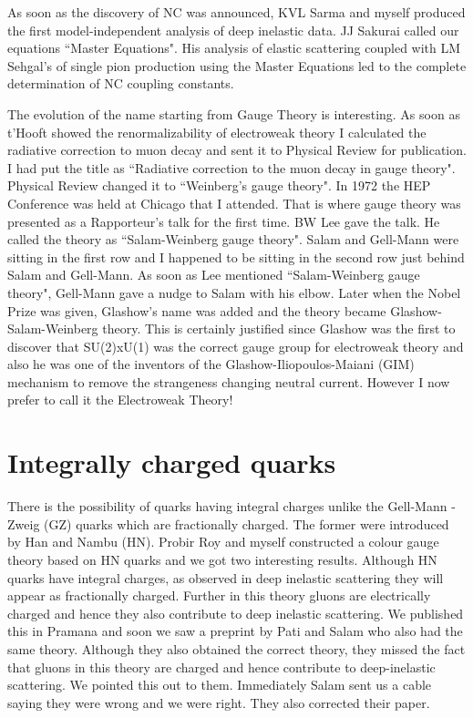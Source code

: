 As soon as the discovery of NC was announced, KVL Sarma and myself 
produced the first model-independent analysis of deep inelastic data. JJ 
Sakurai called our equations ``Master Equations". His analysis of elastic 
scattering coupled with LM Sehgal's of single pion production using the 
Master Equations led to the complete determination of NC coupling 
constants.
\smallskip

The evolution of the name starting from Gauge Theory is interesting. As 
soon as t'Hooft showed the renormalizability of electroweak theory I 
calculated the radiative correction to muon decay and sent it to 
Physical Review for publication. I had put the title as ``Radiative 
correction to the muon decay in gauge theory". Physical Review changed 
it to ``Weinberg's gauge theory". In 1972 the HEP Conference was held at 
Chicago that I attended. That is where gauge theory was presented as a 
Rapporteur's talk for the first time. BW Lee gave the talk. He called 
the theory as ``Salam-Weinberg gauge theory". Salam and Gell-Mann were 
sitting in the first row and I happened to be sitting in the second row 
just behind Salam and Gell-Mann. As soon as Lee mentioned 
``Salam-Weinberg gauge theory", Gell-Mann gave a nudge to Salam with his 
elbow. Later when the Nobel Prize was given, Glashow's name was added 
and the theory became Glashow-Salam-Weinberg theory. This is certainly 
justified since Glashow was the first to discover that SU(2)xU(1) was 
the correct gauge group for electroweak theory and also he was one of 
the inventors of the Glashow-Iliopoulos-Maiani (GIM) mechanism to remove 
the strangeness changing neutral current. However I now prefer to call 
it the Electroweak Theory!

\section*{Integrally charged quarks}

There is the possibility of quarks having integral charges unlike the 
Gell-Mann - Zweig (GZ) quarks which are fractionally charged. The former 
were introduced by Han and Nambu (HN). Probir Roy and myself constructed 
a colour gauge theory based on HN quarks and we got two interesting 
results. Although HN quarks have integral charges, as observed in deep 
inelastic scattering they will appear as fractionally charged. Further 
in this theory gluons are electrically charged and hence they also 
contribute to deep inelastic scattering. We published this in Pramana 
and soon we saw a preprint by Pati and Salam who also had the same 
theory. Although they also obtained the correct theory, they missed the 
fact that gluons in this theory are charged and hence contribute to 
deep-inelastic scattering. We pointed this out to them. Immediately 
Salam sent us a cable saying they were wrong and we were right. They 
also corrected their paper.

